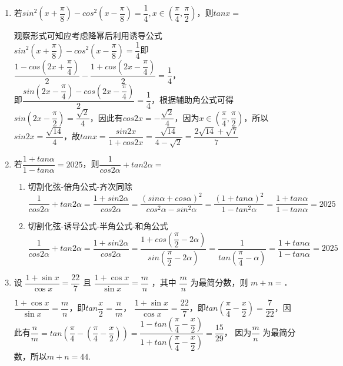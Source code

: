 \begin{enumerate}
\begin{jieda}
    \end{jieda}
    \item 若$sin^2\left(x+\dfrac{\pi}{8}\right) - cos^2\left(x-\dfrac{\pi}{8}\right) = \dfrac{1}{4}, x \in \left(\dfrac{\pi}{4}, \dfrac{\pi}{2}\right)$，则$tanx = $
    \begin{jieda}
        观察形式可知应考虑降幂后利用诱导公式\\
        $sin^2\left(x+\dfrac{\pi}{8}\right) - cos^2\left(x-\dfrac{\pi}{8}\right) = \dfrac{1}{4}$即$\dfrac{1-cos\left(2x+\dfrac{\pi}{4}\right)}{2} - \dfrac{1+cos\left(2x-\dfrac{\pi}{4}\right)}{2} = \dfrac{1}{4}$，\\
        即$\dfrac{sin\left(2x-\dfrac{\pi}{4}\right) - cos\left(2x-\dfrac{\pi}{4}\right)}{2} = \dfrac{1}{4}$，根据辅助角公式可得$sin\left(2x-\dfrac{\pi}{2}\right) = \dfrac{\sqrt{2}}{4}$，因此有$cos2x = -\dfrac{\sqrt{2}}{4}$，因为$x \in \left(\dfrac{\pi}{4}, \dfrac{\pi}{2}\right)$，所以$sin2x = \dfrac{\sqrt{14}}{4}$，故$tanx = \dfrac{sin2x}{1+cos2x} = \dfrac{\sqrt{14}}{4-\sqrt{2}} = \dfrac{2\sqrt{14} + \sqrt{7}}{7}$
    \end{jieda}

    
    \item 若$\dfrac{1+tan\alpha}{1-tan\alpha} = 2025$，则$\dfrac{1}{cos2\alpha} + tan2\alpha = $
    \begin{jieda}
        \begin{enumerate}
            \item 切割化弦-倍角公式-齐次同除 \\
            $\dfrac{1}{cos2\alpha} + tan2\alpha = \dfrac{1+sin2\alpha}{cos2\alpha} = \dfrac{(sin\alpha+cos\alpha)^2}{cos^2\alpha - sin^2\alpha} = \dfrac{(1+tan\alpha)^2}{1 - tan^2\alpha} = \dfrac{1+tan\alpha}{1-tan\alpha} = 2025$
            \item 切割化弦-诱导公式-半角公式-和角公式 \\
            $\dfrac{1}{cos2\alpha} + tan2\alpha = \dfrac{1+sin2\alpha}{cos2\alpha} = \dfrac{1+cos(\dfrac{\pi}{2} - 2\alpha)}{sin(\dfrac{\pi}{2} - 2\alpha)} = \dfrac{1}{tan(\dfrac{\pi}{4} - \alpha)} = \dfrac{1+tan\alpha}{1-tan\alpha} = 2025$
        \end{enumerate}
    \end{jieda}
    
    \item 设 $\dfrac{1+\sin x}{\cos x}=\dfrac{22}{7}$ 且 $\dfrac{1+\cos x}{\sin x}=\dfrac{m}{n}$ ，其中 $\dfrac{m}{n}$ 为最简分数，则 $m+n=$．
    \begin{jieda}
        $\dfrac{1+\cos x}{\sin x}=\dfrac{m}{n}$，即$tan\dfrac{x}{2} = \dfrac{n}{m}$，
        $\dfrac{1+\sin x}{\cos x}=\dfrac{22}{7}$，即$tan(\dfrac{\pi}{4} - \dfrac{x}{2}) = \dfrac{7}{22}$，因此有$\dfrac{n}{m} = tan(\dfrac{\pi}{4} - (\dfrac{\pi}{4} - \dfrac{x}{2})) = \dfrac{1-tan(\dfrac{\pi}{4} - \dfrac{x}{2})}{1+tan(\dfrac{\pi}{4}-\dfrac{x}{2})} = \dfrac{15}{29}$， 因为$\dfrac{m}{n}$ 为最简分数，所以$m+n=44$.
    \end{jieda}
    

\end{enumerate}
